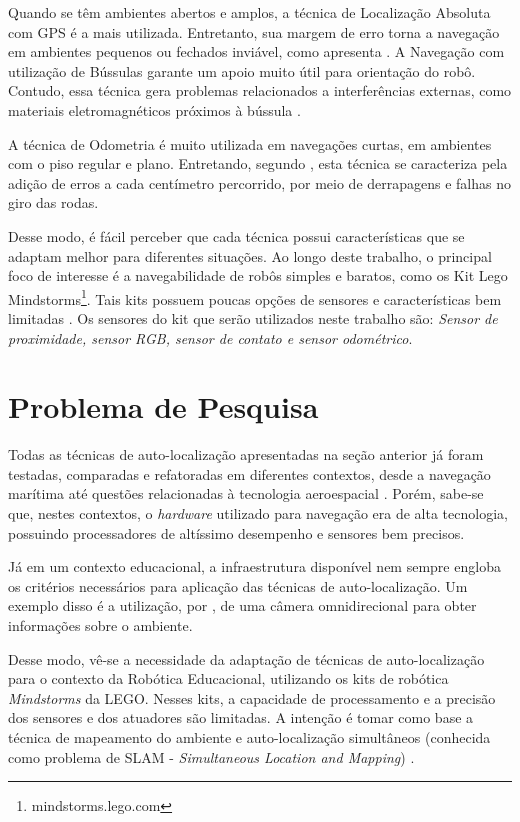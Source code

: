 	Quando se têm ambientes abertos e amplos, a técnica de Localização Absoluta com GPS é a mais utilizada. Entretanto, sua margem de erro torna a navegação em ambientes pequenos ou fechados inviável, como apresenta \cite{roboBulldozerIV}. A Navegação com utilização de Bússulas garante um apoio muito útil para orientação do robô. Contudo, essa técnica gera problemas relacionados a interferências externas, como materiais eletromagnéticos próximos à bússula \cite{roboBulldozerIV}.
	
	A técnica de Odometria é muito utilizada em navegações curtas, em ambientes com o piso regular e plano. Entretando, segundo \cite{roboBulldozerIV}, esta técnica se caracteriza pela adição de erros a cada centímetro percorrido, por meio de derrapagens e falhas no giro das rodas. 

	Desse modo, é fácil perceber que cada técnica possui características que se adaptam melhor para diferentes situações. Ao longo deste trabalho, o principal foco de interesse é a navegabilidade de robôs simples e baratos, como os Kit Lego Mindstorms\footnote{mindstorms.lego.com}. Tais kits possuem poucas opções de sensores e características bem limitadas \cite{drawLegoRobot}. Os sensores do kit que serão utilizados neste trabalho são: \textit{Sensor de proximidade, sensor RGB, sensor de contato e sensor odométrico}.

\section{Problema de Pesquisa}

	Todas as técnicas de auto-localização apresentadas na seção anterior já foram testadas, comparadas e refatoradas em diferentes contextos, desde a navegação marítima até questões relacionadas à tecnologia aeroespacial \cite{localizacaoEMapeamentoPaulo}. Porém, sabe-se que, nestes contextos, o \textit{hardware} utilizado para navegação era de alta tecnologia, possuindo processadores de altíssimo desempenho e sensores bem precisos.

	Já em um contexto educacional, a infraestrutura disponível nem sempre engloba os critérios necessários para aplicação das técnicas de auto-localização. Um exemplo disso é a utilização, por \cite{localizacaoEMapeamentoPaulo}, de uma câmera omnidirecional para obter informações sobre o ambiente.

	Desse modo, vê-se a necessidade da adaptação de técnicas de auto-localização para o contexto da Robótica Educacional, utilizando os kits de robótica \textit{Mindstorms} da LEGO. Nesses kits, a capacidade de processamento e a precisão dos sensores e dos atuadores são limitadas. A intenção é tomar como base a técnica de mapeamento do ambiente e auto-localização simultâneos (conhecida como problema de SLAM - \textit{Simultaneous Location and Mapping}) \cite{slamProblem}.

